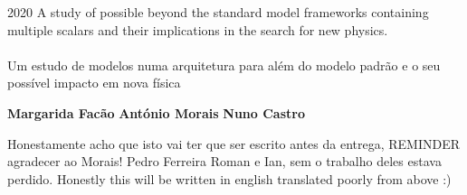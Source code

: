\documentclass[10pt]{report}
\def\ThesisYear{2020}
\renewcommand{\(}{\left(}
\renewcommand{\)}{\right)}
\renewcommand{\[}{\left[}
\renewcommand{\]}{\right]}
\begin{document}
\TitlePage
%	
  {\ThesisYear}
        {A study of possible beyond the standard model frameworks containing multiple scalars and their implications in the search for new physics. \\ \ \\ Um estudo de modelos numa arquitetura para além do modelo padrão e o seu possível impacto em nova física}
\EndTitlePage
\titlepage\ \endtitlepage %

\TitlePage
  \vspace*{55mm}
       {}
       {\textbf{Margarida Facão}}
  \vspace*{5mm}
       {\textbf{António Morais}}
  \vspace*{5mm}
  \TEXT{}
       {\textbf{Nuno Castro}}
  \vspace*{5mm}
\EndTitlePage
\titlepage\ \endtitlepage %

\TitlePage
  \vspace*{55mm}
       {Honestamente acho que isto vai ter que ser escrito antes da entrega,{\color{red} REMINDER agradecer ao Morais! Pedro Ferreira Roman e Ian, sem o trabalho deles estava perdido. }}
  \TEXT{}
       {Honestly this will be written in english translated poorly from above :) }
\EndTitlePage
\titlepage\ \endtitlepage %
\end{document}
